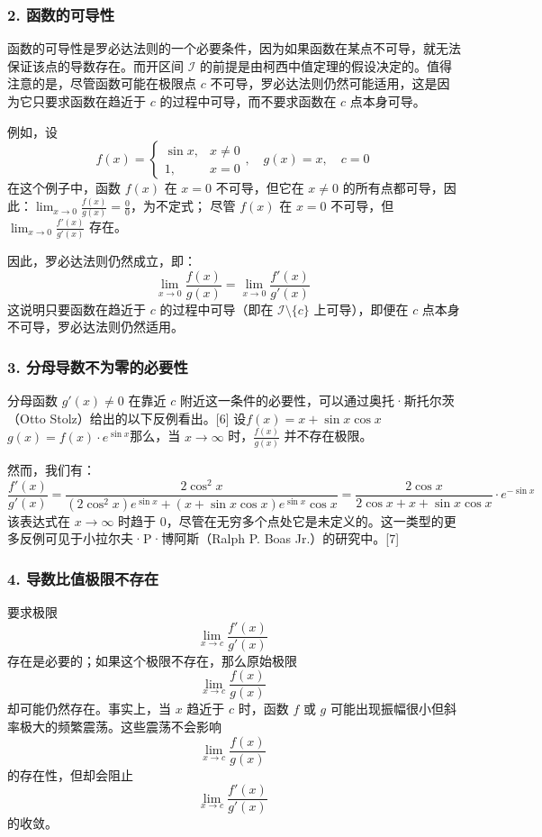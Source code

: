 \subsubsection{2. 函数的可导性}
函数的可导性是罗必达法则的一个必要条件，因为如果函数在某点不可导，就无法保证该点的导数存在。而开区间 $\mathcal{I}$ 的前提是由柯西中值定理的假设决定的。值得注意的是，尽管函数可能在极限点 $c$ 不可导，罗必达法则仍然可能适用，这是因为它只要求函数在趋近于 $c$ 的过程中可导，而不要求函数在 $c$ 点本身可导。

例如，设
$$
f(x) = \begin{cases}
\sin x, & x \ne 0 \\
1, & x = 0
\end{cases}
,\quad g(x) = x,\quad c = 0~
$$
在这个例子中，函数 $f(x)$ 在 $x = 0$ 不可导，但它在 $x \ne 0$ 的所有点都可导，因此：$\lim_{x \to 0} \frac{f(x)}{g(x)} = \frac{0}{0}$，为不定式；
尽管 $f(x)$ 在 $x = 0$ 不可导，但 $\lim_{x \to 0} \frac{f'(x)}{g'(x)}$ 存在。

因此，罗必达法则仍然成立，即：
$$
\lim_{x \to 0} \frac{f(x)}{g(x)} = \lim_{x \to 0} \frac{f'(x)}{g'(x)}~
$$
这说明只要函数在趋近于 $c$ 的过程中可导（即在 $\mathcal{I} \setminus \{c\}$ 上可导），即便在 $c$ 点本身不可导，罗必达法则仍然适用。
\subsubsection{3. 分母导数不为零的必要性}
分母函数 $g'(x) \neq 0$ 在靠近 $c$ 附近这一条件的必要性，可以通过奥托·斯托尔茨（Otto Stolz）给出的以下反例看出。[6] 设$f(x) = x + \sin x \cos x$
$g(x) = f(x) \cdot e^{\sin x}$那么，当 $x \to \infty$ 时，$\frac{f(x)}{g(x)}$ 并不存在极限。

然而，我们有：
$$
\frac{f'(x)}{g'(x)} = \frac{2\cos^2 x}{(2\cos^2 x)e^{\sin x} + (x + \sin x \cos x)e^{\sin x} \cos x}
= \frac{2\cos x}{2\cos x + x + \sin x \cos x} \cdot e^{-\sin x}~
$$
该表达式在 $x \to \infty$ 时趋于 0，尽管在无穷多个点处它是未定义的。这一类型的更多反例可见于小拉尔夫·P·博阿斯（Ralph P. Boas Jr.）的研究中。[7]
\subsubsection{4. 导数比值极限不存在}
要求极限
$$
\lim_{x \to c} \frac{f'(x)}{g'(x)}~
$$
存在是必要的；如果这个极限不存在，那么原始极限
$$
\lim_{x \to c} \frac{f(x)}{g(x)}~
$$
却可能仍然存在。事实上，当 $x$ 趋近于 $c$ 时，函数 $f$ 或 $g$ 可能出现振幅很小但斜率极大的频繁震荡。这些震荡不会影响
$$
\lim_{x \to c} \frac{f(x)}{g(x)}~
$$
的存在性，但却会阻止
$$
\lim_{x \to c} \frac{f'(x)}{g'(x)}~
$$
的收敛。


